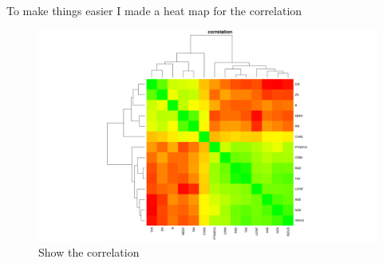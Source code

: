 \documentclass{article}
\begin{document}
To make things easier I made a heat map for the correlation
\begin{figure}[H]

\includegraphics[scale=0.49]{correlation.png}
\caption{Show the correlation}
\end{figure}
\end{document}
